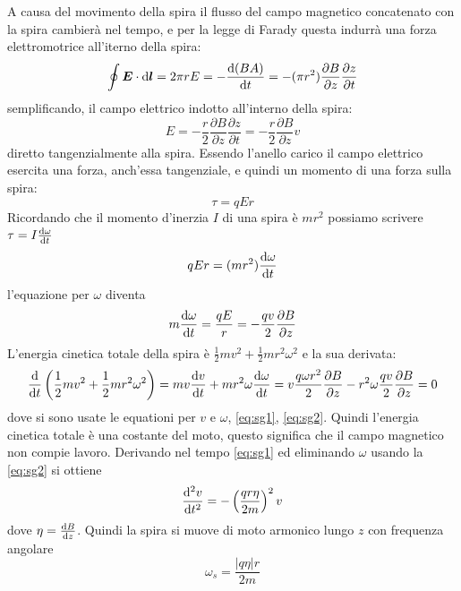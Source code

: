\begin{Es}
  A causa del movimento della spira il flusso del campo magnetico concatenato con la spira cambierà nel tempo, e per la legge di Farady questa indurrà una forza elettromotrice all'iterno della spira:
  \begin{equation}
    \oint \boldsymbol{E}\cdot \mathrm{d}\boldsymbol{l} = 2\pi r E = -\frac{\mathrm{d} (B A)}{\mathrm{d} t} = -(\pi r^2)\frac{\partial B}{\partial z}\frac{\partial z}{\partial t}
  \end{equation}
  semplificando, il campo elettrico indotto all'interno della spira:
  \begin{equation}
    E = -\frac{r}{2}\frac{\partial B}{\partial z}\frac{\partial z}{\partial t}=-\frac{r}{2}\frac{\partial B}{\partial z}v
  \end{equation}
  diretto tangenzialmente alla spira. Essendo l'anello carico il campo elettrico esercita una forza, anch'essa tangenziale, e quindi un momento di una forza sulla spira:
  \begin{equation}
    \tau = q E r
  \end{equation}
  Ricordando che il momento d'inerzia $I$ di una spira è $mr^2$ possiamo scrivere $\tau=I\frac{\mathrm{d}\omega}{\mathrm{d} t}$
  \begin{equation}
    qEr = (m r^2)\frac{\mathrm{d}\omega}{\mathrm{d} t}
  \end{equation}
  l'equazione per $\omega$ diventa
  \begin{equation}
    m\frac{\mathrm{d}\omega}{\mathrm{d} t} = \frac{qE}{r} = -\frac{qv}{2}\frac{\partial B}{\partial z}
    \label{eq:sg2}
  \end{equation}
  L'energia cinetica totale della spira è $\frac{1}{2}mv^2+\frac{1}{2}mr^2\omega^2$ e la sua derivata:
  \begin{equation}
    \frac{\mathrm{d}}{\mathrm{d} t}\left(\frac{1}{2}mv^2+\frac{1}{2}mr^2\omega^2\right) = mv\frac{\mathrm{d} v}{\mathrm{d} t} + mr^2\omega\frac{\mathrm{d}\omega}{\mathrm{d} t} = v \frac{q\omega r^2}{2}\frac{\partial B}{\partial z} - r^2\omega \frac{qv}{2}\frac{\partial B}{\partial z} = 0
  \end{equation}
  dove si sono usate le equationi per $v$ e $\omega$, \eqref{eq:sg1}, \eqref{eq:sg2}. Quindi l'energia cinetica totale è una costante del moto, questo significa che il campo magnetico non compie lavoro. Derivando nel tempo \eqref{eq:sg1} ed eliminando $\omega$ usando la \eqref{eq:sg2} si ottiene
  \begin{equation}
    \frac{\mathrm{d}^2 v}{\mathrm{d} t^2} = -\left(\frac{q r \eta}{2m}\right)^2 v
  \end{equation}
  dove $\eta=\frac{\mathrm{d} B}{\mathrm{d} z}$. Quindi la spira si muove di moto armonico lungo $z$ con frequenza angolare
  \begin{equation}
    \omega_s = \frac{|q\eta| r}{2m}
  \end{equation}


\end{Es}
